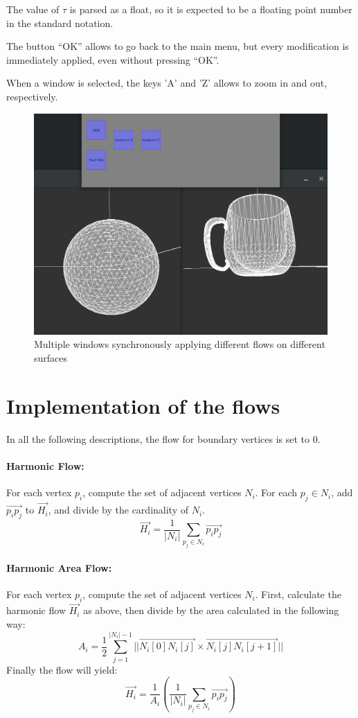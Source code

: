 \documentclass{article}
\begin{document}
The value of $\tau$ is parsed as a float, so it is expected to be a floating point
number in the standard notation.

The button ``OK'' allows to go back to the main menu, but every modification
is immediately applied, even without pressing ``OK''.

When a window is selected, the keys 'A' and 'Z' allows to zoom in and out, respectively.

\begin{figure}[h]
  \begin{center}
    \includegraphics[width=.5\textwidth]{img/mult.png}
    \caption{Multiple windows synchronously applying different flows on different surfaces}
    \label{fig:mult}
  \end{center}
\end{figure}

\section*{Implementation of the flows}

In all the following descriptions, the flow for boundary vertices is set to 0.

\paragraph*{Harmonic Flow:}
For each vertex $p_i$, compute the set of adjacent vertices $N_i$.
For each $p_j \in N_i$, add $\overrightarrow{p_i p_j}$ to $\overrightarrow{H_i}$, and divide by
the cardinality of $N_i$.
\begin{equation*}
  \overrightarrow{H_i}=\frac{1}{|N_i|} \sum_{p_j \in N_i} \overrightarrow{p_i p_j}
\end{equation*}

\paragraph*{Harmonic Area Flow:}
For each vertex $p_i$, compute the set of adjacent vertices $N_i$.
First, calculate the harmonic flow $\overrightarrow{H_i}$ as above, then divide by the area
calculated in the following way:
\begin{equation*}
  A_i = \frac{1}{2} \sum_{j = 1}^{|N_i|-1} ||\overrightarrow{N_i[0] N_i[j]} \times \overrightarrow{N_i[j] N_i[j+1]}||
\end{equation*}
Finally the flow will yield:
\begin{equation*}
  \overrightarrow{H_i}=\frac{1}{A_i} \left( \frac{1}{|N_i|} \sum_{p_j \in N_i} \overrightarrow{p_i p_j} \right)
\end{equation*}
\end{document}

